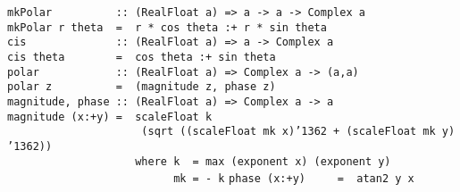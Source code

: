 %
\eprogB\noindent\bprogB
\mbox{\tt mkPolar\ \ \ \ \ \ \ \ \ \ ::\ (RealFloat\ a)\ =>\ a\ ->\ a\ ->\ Complex\ a}\\
\mbox{\tt mkPolar\ r\ theta\ \ =\ \ r\ *\ cos\ theta\ :+\ r\ *\ sin\ theta}
%
\eprogB\noindent\bprogB
\mbox{\tt cis\ \ \ \ \ \ \ \ \ \ \ \ \ \ ::\ (RealFloat\ a)\ =>\ a\ ->\ Complex\ a}\\
\mbox{\tt cis\ theta\ \ \ \ \ \ \ \ =\ \ cos\ theta\ :+\ sin\ theta}
%
\eprogB\noindent\bprogB
\mbox{\tt polar\ \ \ \ \ \ \ \ \ \ \ \ ::\ (RealFloat\ a)\ =>\ Complex\ a\ ->\ (a,a)}\\
\mbox{\tt polar\ z\ \ \ \ \ \ \ \ \ \ =\ \ (magnitude\ z,\ phase\ z)}
%
\eprogB\noindent\bprogB
\mbox{\tt magnitude,\ phase\ ::\ (RealFloat\ a)\ =>\ Complex\ a\ ->\ a}\\
\mbox{\tt magnitude\ (x:+y)\ =\ \ scaleFloat\ k}\\
\mbox{\tt \ \ \ \ \ \ \ \ \ \ \ \ \ \ \ \ \ \ \ \ \ (sqrt\ ((scaleFloat\ mk\ x){\char'136}2\ +\ (scaleFloat\ mk\ y){\char'136}2))}\\
\mbox{\tt \ \ \ \ \ \ \ \ \ \ \ \ \ \ \ \ \ \ \ \ where\ k\ \ =\ max\ (exponent\ x)\ (exponent\ y)}\\
\mbox{\tt \ \ \ \ \ \ \ \ \ \ \ \ \ \ \ \ \ \ \ \ \ \ \ \ \ \ mk\ =\ -\ k}
%
%
\eprogB\noindent\bprogB
\mbox{\tt phase\ (x:+y)\ \ \ \ \ =\ \ atan2\ y\ x}
\eprogB
